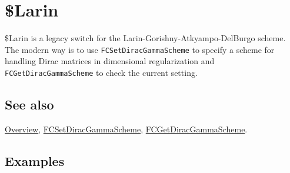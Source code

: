 \documentclass[../FeynCalcManual.tex]{subfiles}
\begin{document}
\hypertarget{larin}{%
\section{\$Larin}\label{larin}}

\$Larin is a legacy switch for the Larin-Gorishny-Atkyampo-DelBurgo
scheme. The modern way is to use \texttt{FCSetDiracGammaScheme} to
specify a scheme for handling Dirac matrices in dimensional
regularization and \texttt{FCGetDiracGammaScheme} to check the current
setting.

\subsection{See also}

\hyperlink{toc}{Overview},
\hyperlink{fcsetdiracgammascheme}{FCSetDiracGammaScheme},
\hyperlink{fcgetdiracgammascheme}{FCGetDiracGammaScheme}.

\subsection{Examples}
\end{document}
